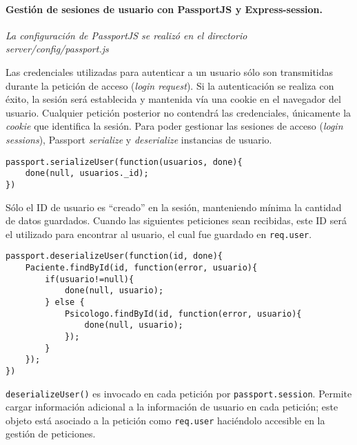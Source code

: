  
\paragraph*{Gestión de sesiones de usuario con PassportJS y Express-session.}
\textit{La configuración de PassportJS se realizó en el directorio server/config/passport.js}


Las credenciales utilizadas para autenticar a un usuario sólo son transmitidas durante la petición de acceso (\textit{login request}). Si la autenticación se realiza con éxito, la sesión será establecida y mantenida vía una cookie en el navegador del usuario.
Cualquier petición posterior no contendrá las credenciales, únicamente la \textit{cookie} que identifica la sesión. 
Para poder gestionar las sesiones de acceso (\textit{login sessions}), Passport \textit{serialize} y \textit{deserialize} instancias de usuario.


\medskip
\begin{lstlisting}
passport.serializeUser(function(usuarios, done){
	done(null, usuarios._id);
})
\end{lstlisting}


Sólo el ID de usuario es “creado” en la sesión, manteniendo mínima la cantidad de datos guardados. Cuando las siguientes peticiones sean recibidas, este ID será el utilizado para encontrar al usuario, el cual fue guardado en \texttt{req.user}.


\medskip
\begin{lstlisting}
passport.deserializeUser(function(id, done){
	Paciente.findById(id, function(error, usuario){
		if(usuario!=null){
			done(null, usuario);
		} else {
			Psicologo.findById(id, function(error, usuario){
				done(null, usuario);
			});
		}
	});
})
\end{lstlisting}

\texttt{deserializeUser()} es invocado en cada petición por \texttt{passport.session}. Permite cargar información adicional a la información de usuario en cada petición; este objeto está asociado a la petición como \texttt{req.user} haciéndolo accesible en la gestión de peticiones.


